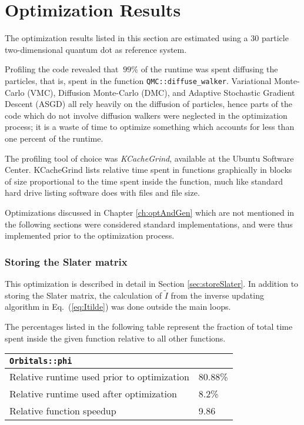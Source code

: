 \section{Optimization Results}
\label{sec:optRes}

The optimization results listed in this section are estimated using a $30$ particle two-dimensional quantum dot as reference system.

Profiling the code revealed that $~99\%$ of the runtime was spent diffusing the particles, that is, spent in the function \verb+QMC::diffuse_walker+. Variational Monte-Carlo (VMC), Diffusion Monte-Carlo (DMC), and Adaptive Stochastic Gradient Descent (ASGD) all rely heavily on the diffusion of particles, hence parts of the code which do not involve diffusion walkers were neglected in the optimization process; it is a waste of time to optimize something which accounts for less than one percent of the runtime.  

The profiling tool of choice was \textit{KCacheGrind}, available at the Ubuntu Software Center. KCacheGrind lists relative time spent in functions graphically in blocks of size proportional to the time spent inside the function, much like standard hard drive listing software does with files and file size.

Optimizations discussed in Chapter \ref{ch:optAndGen} which are not mentioned in the following sections were considered standard implementations, and were thus implemented prior to the optimization process.

\subsubsection{Storing the Slater matrix}

This optimization is described in detail in Section \ref{sec:storeSlater}. In addition to storing the Slater matrix, the calculation of $\tilde I$ from the inverse updating algorithm in Eq.~(\ref{eq:Itilde}) was done outside the main loops.

The percentages listed in the following table represent the fraction of total time spent inside the given function relative to all other functions. 

\begin{tabular}{ll}
 \verb+Orbitals::phi+ & \\
 \hline\hline
 Relative runtime used prior to optimization & 80.88\% \\
 Relative runtime used after optimization    & 8.2\% \\
 \hline
 Relative function speedup                   & 9.86
\end{tabular}


